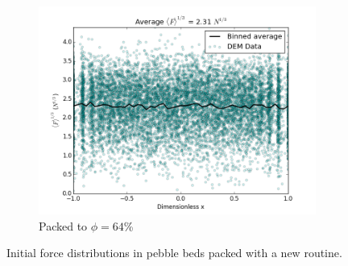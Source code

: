 \begin{figure}[!ht]
    \begin{subfigure}[b]{0.4\textwidth}
        \centering
        \includegraphics[width=\textwidth]{figures/initial_packing_study/64-deform-force-profile.png}
        \caption{Packed to $\phi = 64$\%}
    \end{subfigure}
    \caption{Initial force distributions in pebble beds packed with a new routine.}
\label{fig:contact-forces-scatter-initial}
\end{figure}

